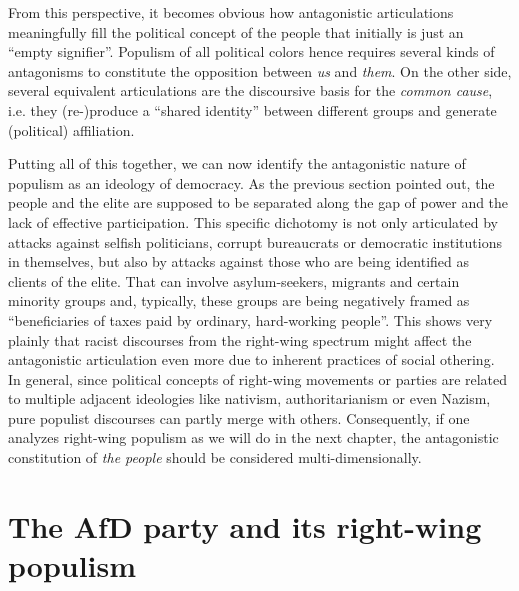 \documentclass[a4paper]{scrreprt}
\begin{document}
From this perspective, it becomes obvious how antagonistic articulations meaningfully fill the political concept of the people that initially is just an ``empty signifier''. \cite[p.~72]{laclau:2005} Populism of all political colors hence requires several kinds of antagonisms to constitute the opposition between {\em us} and {\em them}. On the other side, several equivalent articulations are the discoursive basis for the {\em common cause}, i.e. they (re-)produce a ``shared identity'' between different groups and generate (political) affiliation. \cite[p.~9]{mudde:2017}\par
Putting all of this together, we can now identify the antagonistic nature of populism as an ideology of democracy. As the previous section pointed out, the people and the elite are supposed to be separated along the gap of power and the lack of effective participation. This specific dichotomy is not only articulated by attacks against selfish politicians, corrupt bureaucrats or democratic institutions in themselves, but also by attacks against those who are being identified as clients of the elite. That can involve asylum-seekers, migrants and certain minority groups and, typically, these groups are being negatively framed as ``beneficiaries of taxes paid by ordinary, hard-working people''. \cite[p.~32]{canovan:2002} This shows very plainly that racist discourses from the right-wing spectrum might affect the antagonistic articulation even more due to inherent practices of social othering. In general, since political concepts of right-wing movements or parties are related to multiple adjacent ideologies like nativism, authoritarianism or even Nazism, pure populist discourses can partly merge with others. Consequently, if one analyzes right-wing populism as we will do in the next chapter, the antagonistic constitution of {\em the people} should be considered multi-dimensionally.
\chapter{The AfD party and its right-wing populism}
\end{document}
